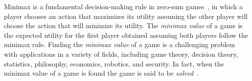 \documentclass[runningheads]{llncs}
\begin{document}
\begin{abstract}

\end{abstract}





Minimax is a fundamental decision-making rule in zero-sum games~\cite{wald1945statistical}, 
in which a player chooses an action that maximizes its utility assuming the other player will 
choose the action that will minimize its utility. The \emph{minimax value} of a game is the expected utility for the first player obtained assuming both players follow the minimax rule. 
Finding the \emph{minimax value} of a game is a challenging problem with applications in a variety of fields, including game theory, decision theory,  statistics, philosophy, economics, robotics, and security. 
In fact, when the minimax value of a game is found the game is said to be \emph{solved}~\cite{schaeffer2007checkers,irving2000solving,saffidine2011solving}. 
\end{document}
